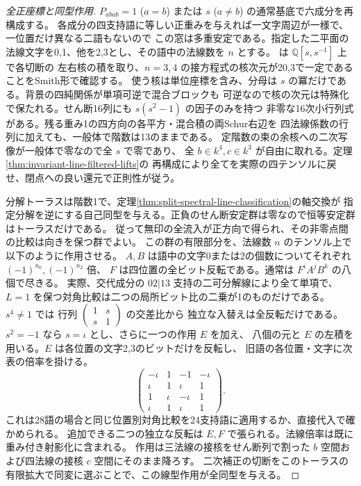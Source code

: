 \begin{proof}[全正座標と同型作用]
$P_{abab}=1$ ($a=b$) または $s$ ($a\ne b$) の通常基底で六成分を再構成する。
各成分の四支持語に等しい正重みを与えれば一文字周辺が一様で、一位置だけ異なる二語もないので
この窓は多重安定である。指定した二平面の法線文字を0,1、他を2,3とし、その語中の法線数を $n$ とする。
 は $\mathbb Q[s,s^{-1}]$ 上で各切断の
左右核の積を取り、$n=3,4$ の接方程式の核次元が20,3で一定であることをSmith形で確認する。
使う核は単位座標を含み、分母は $s$ の冪だけである。背景の四純関係が単項可逆で混合ブロックも
可逆なので核の次元は特殊化で保たれる。せん断16列にも $s(s^2-1)$ の因子のみを持つ
非零な16次小行列式がある。残る重み1の四方向の各平方・混合積の両Schur右辺を
四法線係数の行列に加えても、一般体で階数は13のままである。
定階数の束の余核への二次写像が一般体で零なので全 $s$ で零であり、
全 $b\in k^4,c\in k^3$ が自由に取れる。定理\ref{thm:invariant-line-filtered-lifts}の
再構成により全てを実際の四テンソルに戻せ、閉点への良い還元で正則性が従う。

分解トーラスは階数1で、定理\ref{thm:split-spectral-line-classification}の軸交換が
指定分解を逆にする自己同型を与える。正負のせん断安定群は零なので恒等安定群はトーラスだけである。
従って無印の全流入が正方向で得られ、その非零点間の比較は向きを保つ群でよい。
この群の有限部分を、法線数 $n$ のテンソル上で以下のように作用させる。
$A,B$ は語中の文字0または2の個数についてそれぞれ $(-1)^{n_0},(-1)^{n_2}$ 倍、
$F$ は四位置の全ビット反転である。通常は $F^i A^j B^k$ の八個で尽きる。
実際、交代成分の $02|13$ 支持の二可分解線により全て単項で、
$L=1$ を保つ対角比較は二つの局所ビット比の二乗が1のものだけである。$s^4\ne1$ では
行列 $\left(\begin{smallmatrix}1&s\\s&1\end{smallmatrix}\right)$ の交差比から
独立な入替えは全反転だけである。$s^2=-1$ なら $s=\iota$ とし、さらに一つの作用 $E$ を加え、
八個の元と $E$ の左積を用いる。$E$ は各位置の文字2,3のビットだけを反転し、
旧語の各位置・文字に次表の倍率を掛ける。
\[
 \begin{pmatrix}
 -\iota&1&-1&-\iota\\
 \iota&1&\iota&1\\
 1&\iota&-\iota&1\\
 \iota&1&\iota&1
 \end{pmatrix}.
\]
これは28語の場合と同じ位置別対角比較を24支持語に適用するか、直接代入で確かめられる。
追加できる二つの独立な反転は $E,F$ で張られる。法線倍率は既に重み付き射影化に含まれる。
作用は三法線の接核をせん断列で割った $b$ 空間および四法線の接核 $c$ 空間にそのまま降ろす。
二次補正の切断をこのトーラスの有限拡大で同変に選ぶことで、この線型作用が全同型を与える。
\end{proof}
